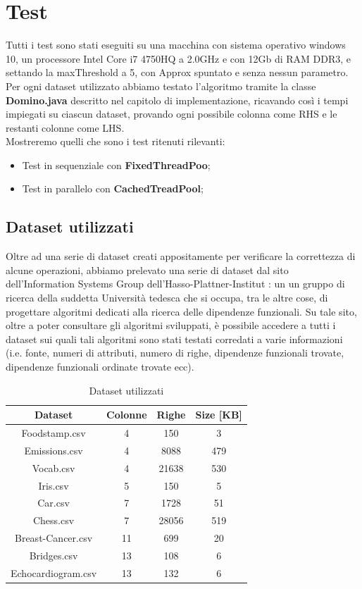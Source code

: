 \section{Test}
Tutti i test sono stati eseguiti su una macchina con sistema operativo windows 10, un processore Intel Core i7 4750HQ a 2.0GHz e con 12Gb di RAM DDR3, e settando la maxThreshold a 5, con Approx spuntato e senza nessun parametro.\\
Per ogni dataset utilizzato abbiamo testato l'algoritmo tramite la classe \textbf{Domino.java} descritto nel capitolo di implementazione, ricavando così i tempi impiegati su ciascun dataset, provando ogni possibile colonna come RHS e le restanti colonne come LHS.  \\

Mostreremo quelli che sono i test ritenuti rilevanti:
\begin{itemize}
	\item Test in sequenziale con \textbf{FixedThreadPoo};
	\item Test in parallelo con \textbf{CachedTreadPool};
\end{itemize}
\subsection{Dataset utilizzati}
Oltre ad una serie di dataset creati appositamente per verificare la correttezza di alcune operazioni, abbiamo prelevato una serie di dataset dal sito dell'Information Systems Group dell'Hasso-Plattner-Institut \cite{metanome}: un un gruppo di ricerca della suddetta Università tedesca che si occupa, tra le altre cose, di progettare algoritmi dedicati alla ricerca delle dipendenze funzionali. Su tale sito, oltre a poter consultare gli algoritmi sviluppati, è possibile accedere a tutti i dataset sui quali tali algoritmi sono stati testati corredati a varie informazioni (i.e. fonte, numeri di attributi, numero di righe, dipendenze funzionali trovate, dipendenze funzionali ordinate trovate ecc).\\
\begin{table}[H]
	\centering
	\begin{tabular}{|c|c|c|c|}
		\hline 
		\textbf{Dataset} & \textbf{Colonne} & \textbf{Righe}  & \textbf{Size [KB]} \\ 
		\hline 
		Foodstamp.csv & 4  & 150 & 3 \\ 
		\hline 
		Emissions.csv& 4 & 8088 &479  \\ 
		\hline 
		Vocab.csv& 4 & 21638 &530  \\ 
		\hline 
		Iris.csv& 5 &  150&5  \\ 
		\hline 
		Car.csv&7  &  1728&51  \\ 
		\hline 
		Chess.csv&7  &28056  &519  \\ 
		\hline 
		Breast-Cancer.csv& 11 & 699  & 20  \\ 
		\hline 
		Bridges.csv& 13 & 108 &  6\\ 
		\hline 
		Echocardiogram.csv& 13 & 132 & 6 \\ 
		\hline 
	\end{tabular}
	\caption{Dataset utilizzati}
	\label{tab:Dataset utilizzati}
\end{table}

